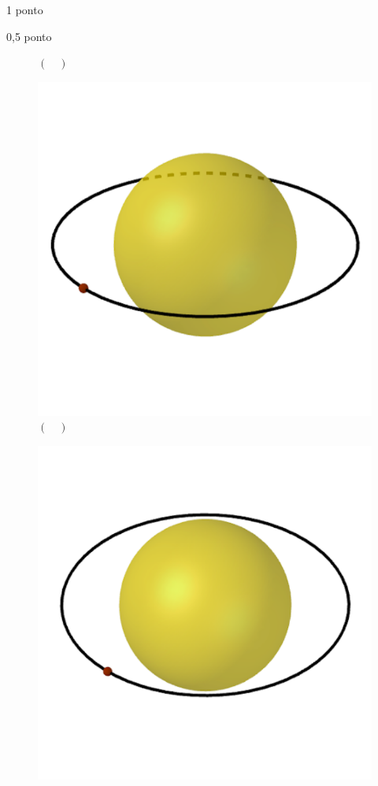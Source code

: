 \documentclass{../lista}
\begin{document}
\begin{questao}{1 ponto}
\begin{pergunta}{0,5 ponto}
\begin{multicols}{3}
\begin{figure}[H]
					\captionsetup{labelformat=empty}
					\caption{$(\quad)$}
				\end{figure}
				\begin{figure}[H]
					\centering
					\includegraphics[scale=0.2]{./img/5b3.png}
					\captionsetup{labelformat=empty}
					\caption{$(\quad)$}
				\end{figure}
				\begin{figure}[H]
					\centering
					\includegraphics[scale=0.2]{./img/5b4.png}

\end{figure}
\end{multicols}
\end{pergunta}
\end{questao}
\end{document}
